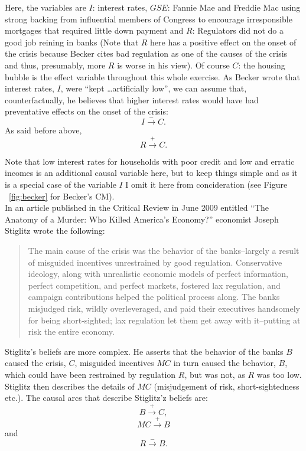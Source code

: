 \documentclass[12pt]{article}
\begin{document}
Here, the variables are $I$: interest rates, $GSE$: Fannie Mae and Freddie Mac using strong backing from influential members of Congress to encourage irresponsible mortgages that required little down payment and $R$: Regulators did not do a good job reining in banks (Note that $R$ here has a positive effect on the onset of the crisis because Becker cites bad regulation as one of the causes of the crisis and thus, presumably, more $R$ is worse in his view). Of course $C$: the housing bubble is the effect variable throughout this whole exercise. As Becker wrote that interest rates, $I$, were ``kept \ldots artificially low'', we can assume that, counterfactually, he believes that higher interest rates would have had preventative effects on the onset of the crisis:
$$I \xrightarrow{-} C.$$
As said before above,
$$R \xrightarrow{+} C.$$

Note that low interest rates for households with poor credit and low and erratic incomes is an additional causal variable here, but to keep things simple and as it is a special case of the variable $I$ I omit it here from concideration (see Figure ~\ref{fig:becker} for Becker's CM).\\

In an article published in the Critical Review in June 2009 entitled ``The Anatomy of a Murder: Who Killed America's Economy?'' economist Joseph Stiglitz wrote the following:

\begin{quotation}
The main cause of the crisis was the behavior of the banks--largely a result of misguided incentives unrestrained by good regulation. Conservative ideology, along with unrealistic economic models of perfect information, perfect competition, and perfect markets, fostered lax regulation, and campaign contributions helped the political process along. The banks misjudged risk, wildly overleveraged, and paid their executives handsomely for being short-sighted; lax regulation let them get away with it--putting at risk the entire economy.
\end{quotation}

Stiglitz's beliefs are more complex. He asserts that the behavior of the banks $B$ caused the crisis, $C$, misguided incentives $MC$ in turn caused the behavior, $B$, which could have been restrained by regulation $R$, but was not, as $R$ was too low. Stiglitz then describes the details of $MC$ (misjudgement of risk, short-sightedness etc.). The causal arcs that describe Stiglitz'z beliefs are:
$$B \xrightarrow{+} C,$$
$$MC \xrightarrow{+} B$$
and
$$R \xrightarrow{-}B.$$
\end{document}
